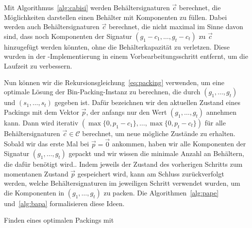 \begin{rem}
    Mit Algorithmus~\ref{alg:cabisi} werden Behältersignaturen $\vec{c}$ berechnet, die Möglichkeiten darstellen einen Behälter mit Komponenten zu füllen.
    Dabei werden auch Behältersignaturen $\vec{c}$ berechnet, die nicht maximal im Sinne davon sind, dass noch Komponenten der Signatur $(g_1 - c_1, \ldots, g_t - c_t)$ zu $\vec{c}$ hinzugefügt werden könnten, ohne die Behälterkapazität zu verletzen.
    Diese wurden in der \Cpp\hyp Implementierung in einem Vorbearbeitungsschritt entfernt, um die Laufzeit zu verbessern.
\end{rem}

Nun können wir die Rekursionsgleichung~\eqref{eq:packing} verwenden, um eine optimale Lösung der Bin-Packing-Instanz zu berechnen, die durch $(g_1, \ldots, g_t)$ und $(s_1, \ldots, s_t)$ gegeben ist.
Dafür bezeichnen wir den aktuellen Zustand eines Packings mit dem Vektor $\vec{p}$, der anfangs nur den Wert $(g_1, \ldots, g_t)$ annehmen kann.
Dann wird iterativ $(\max\{0, p_1 - c_1\}, \ldots, \max\{0, p_t - c_t\})$ für alle Behältersignaturen $\vec{c} \in \mathcal{C}$ berechnet, um neue mögliche Zustände zu erhalten.
Sobald wir das erste Mal bei $\vec{p} = \vec{0}$ ankommen, haben wir alle Komponenten der Signatur $(g_1, \ldots, g_t)$ gepackt und wir wissen die minimale Anzahl an Behältern, die dafür benötigt wird..
Indem jeweils der Zustand des vorherigen Schritts zum momentanen Zustand $\vec{p}$ gespeichert wird, kann am Schluss zurückverfolgt werden, welche Behältersignaturen im jeweiligen Schritt verwendet wurden, um die Komponenten in $(g_1, \ldots, g_t)$ zu packen.
Die Algorithmen~\ref{alg:pape} und~\ref{alg:bapa} formalisieren diese Ideen.

\begin{algorithm}
    \caption{Finden eines optimalen Packings mit }
    \label{alg:pape}
    \begin{algorithmic}[1]
                 
                    \EndIf
                \EndFor
                \EndFor
            \EndFor
        \EndFunction
    \end{algorithmic}
\end{algorithm}

